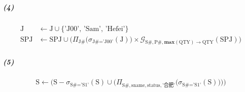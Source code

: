 \documentclass{article}
\begin{document}
\subparagraph{(4)}
\begin{Large}
    \begin{align*}
        \text{J}   & \leftarrow \text{J} \cup \{\text{'J00'},\, \text{'Sam'},\, \text{'Hefei'}\}                                                                                                                                          \\
        \text{SPJ} & \leftarrow \text{SPJ} \cup \Big(\Pi_{\text{J\#}}\big(\sigma_{\text{J\#} = \text{'J00'}}(\text{J})\big) \times \mathcal{G}_{\text{S\#}, \text{P\#}, \textbf{max}(\text{QTY}) \rightarrow \text{QTY}}(\text{SPJ})\Big)
    \end{align*}
\end{Large}

\subparagraph{(5)}
\begin{Large}
    \begin{equation*}
        \text{S} \leftarrow \bigg(\text{S} - \sigma_{\text{S\#} = \text{'S1'}}(\text{S}) \cup \Big(\Pi_{\text{S\#}, \text{sname}, \text{status}, \text{'合肥'}}\big(\sigma_{\text{S\#} = \text{'S1'}}(\text{S})\big)\Big)\bigg)
    \end{equation*}
\end{Large}
\end{document}
